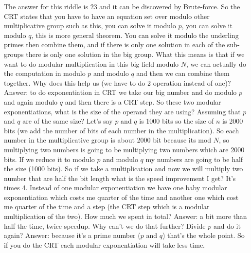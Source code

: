 The answer for this riddle is 23 and it can be discovered by Brute-force. 
So the CRT states that you have to have an equation set over 
modulo other multiplicative group such as
this, you can solve it modulo $p$, you can solve it modulo $q$, this is more
general theorem. You can solve it modulo the underling primes then combine them,
and if there is only one solution in each of the sub-groups there is only one
solution in the big group. What this means is that if we want to do modular
multiplication in this big field modulo $N$, we can actually do the computation
in modulo $p$ and modulo $q$ and then we can combine them together. Why does
this help us (we have to do 2 operation instead of one)? Answer: to do
exponentiation in CRT we take our  big number and do modulo $p$ and again modulo
$q$ and then there is a CRT step. So these two modular exponentiations, what is
the size of the operand they are using? Assuming that $p$ and $q$ are of the
same size? Let's say $p$ and $q$ is 1000 bits so the size of $n$ is 2000 bits
(we add the number of bits of each number in the multiplication).  So each
number in the multiplicative group is about 2000 bit because its mod $N$, so
multiplying two numbers is going to be multiplying two numbers which are 2000
bits. If we reduce it to modulo $p$ and modulo $q$ my numbers are going to be
half the size (1000 bits). So if we take a multiplication and now we will
multiply two number that are half the bit length what is the speed improvement I
get? It's times 4. Instead of one modular exponentiation we have one baby
modular exponentiation which costs me quarter of the time and another one which
cost me quarter of the time and a step (the CRT step which is a modular
multiplication of the two). How much we spent in total? Answer: a bit more than
half the time, twice speedup. Why can't we do that further? Divide $p$ and do it
again? Answer: because it's a prime number ($p$ and $q$) that's the whole point.
So if you do the CRT each modular exponentiation will take less time. 

